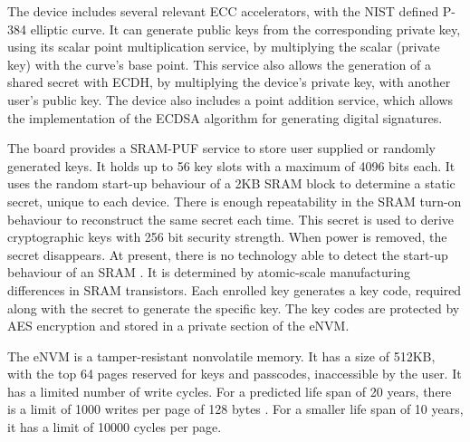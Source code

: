 The device includes several relevant \ac{ECC} accelerators, with the \ac{NIST} defined P-384 elliptic curve.
It can generate public keys from the corresponding private key, using its scalar point multiplication service, by multiplying the scalar (private key) with the curve's base point. This service also allows the generation of a shared secret with \ac{ECDH}, by multiplying the device's private key, with another user's public key.
The device also includes a point addition service, which allows the implementation of the \ac{ECDSA} algorithm for generating digital signatures.

The board provides a SRAM-PUF service to store user supplied or randomly generated keys.  It holds up to 56 key slots with a maximum of 4096 bits each.
It uses the random start-up behaviour of a 2KB \ac{SRAM} block to determine a static secret, unique to each device. There is enough repeatability in the SRAM turn-on behaviour to reconstruct the same secret each time. This secret is used to derive cryptographic keys with 256 bit security strength.
When power is removed, the secret disappears. At present, there is no technology able to detect the start-up behaviour of an SRAM \cite{smartfusionSecurityPractices}. It is determined by atomic-scale manufacturing differences in SRAM transistors.
Each enrolled key generates a key code, required along with the secret to generate the specific key.
The key codes are protected by \ac{AES} encryption and stored in a private section of the eNVM.

The eNVM is a tamper-resistant nonvolatile memory. It has a size of 512KB, with the top 64 pages reserved for keys and passcodes, inaccessible by the user.
It has a limited number of write cycles. For a predicted life span of 20 years, there is a limit of 1000 writes per page of 128 bytes \cite{smartfusionDatasheet}. For a smaller life span of 10 years, it has a limit of 10000 cycles per page.

